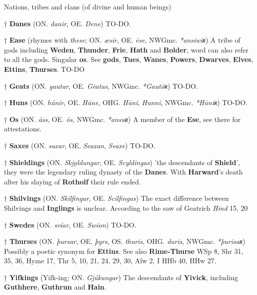 Nations, tribes and clans (of divine and human beings)

† \textbf{Danes} (ON. \emph{danir}, OE. \emph{Dene})
 TO-DO.

† \textbf{Ease} (rhymes with \emph{these}; ON. \emph{æsir}, OE. \emph{ēse}, NWGmc. \emph{*ansiwiʀ})
 A tribe of gods including \textbf{Weden}, \textbf{Thunder}, \textbf{Frie}, \textbf{Hath} and \textbf{Bolder}, word can also refer to all the gods. Singular \textbf{os}. See \textbf{gods}, \textbf{Tues}, \textbf{Wanes}, \textbf{Powers}, \textbf{Dwarves}, \textbf{Elves}, \textbf{Ettins}, \textbf{Thurses}.
 TO-DO
 
† \textbf{Geats} (ON. \emph{gautar}, OE. \emph{Gēatas}, NWGmc. \emph{*Gautōʀ})
 TO-DO.

† \textbf{Huns} (ON. \emph{húnir}, OE. \emph{Hūne}, OHG. \emph{Hūni}, \emph{Hunni}, NWGmc. \emph{*Hūnīʀ})
 TO-DO.
 
† \textbf{Os} (ON. \emph{áss}, OE. \emph{ōs}, NWGmc. \emph{*ansuʀ})
 A member of the \textbf{Ese}, see there for attestations.
 
† \textbf{Saxes} (ON. \emph{saxar}, OE. \emph{Seaxan}, \emph{Seaxe})
 TO-DO.
 
† \textbf{Shieldings} (ON. \emph{Skjǫldungar}, OE. \emph{Scyldingas})
 'the descendants of \textbf{Shield}', they were the legendary ruling dynasty of the \textbf{Danes}. With \textbf{Harward}'s death after his slaying of \textbf{Rotholf} their rule ended.
 
† \textbf{Shilvings} (ON. \emph{Skilfingar}, OE. \emph{Scilfingas})
 The exact difference between Shilvings and \textbf{Inglings} is unclear. According to the saw of Geatrich
 \emph{Hind} 15, 20

† \textbf{Swedes} (ON. \emph{svíar}, OE. \emph{Swēon})
 TO-DO.

† \textbf{Thurses} (ON. \emph{þursar}, OE. \emph{þyrs}, OS. \emph{thuris}, OHG. \emph{duris}, NWGmc. \emph{*þurisaʀ})
 Possibly a poetic synonym for \textbf{Ettins}. See also \textbf{Rime-Thurse}
 WSp 8, Shr 31, 35, 36, Hyme 17, Thr 5, 10, 21, 24, 29, 30, Alw 2, I HHb 40, HHw 27.

† \textbf{Yifkings} (Yifk-ing; ON. \emph{Gjúkungar})
 The descendants of \textbf{Yivick}, including \textbf{Guthhere}, \textbf{Guthrun} and \textbf{Hain}.
